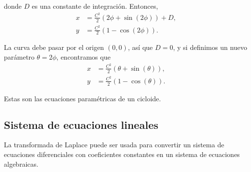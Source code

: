 \begin{ejemplo}
    donde $D$ es una constante de integración. Entonces,
    \begin{align*}
        x &= \frac{C^2}{2} (2\phi + \sin(2\phi)) + D, \\
        y &= \frac{C^2}{2} (1 - \cos(2\phi)).
    \end{align*}

    La curva debe pasar por el origen $(0,0)$, así que $D = 0$, y si definimos un nuevo parámetro $\theta = 2\phi$, encontramos que
    \begin{align*}
        x &= \frac{C^2}{2} (\theta + \sin(\theta)), \\
        y &= \frac{C^2}{2} (1 - \cos(\theta)).
    \end{align*}

    Estas son las ecuaciones paramétricas de un cicloide.
\end{ejemplo}

\subsection{Sistema de ecuaciones lineales}

La transformada de Laplace puede ser usada para convertir un sistema de ecuaciones diferenciales con coeficientes constantes en un sistema de ecuaciones algebraicas. 

